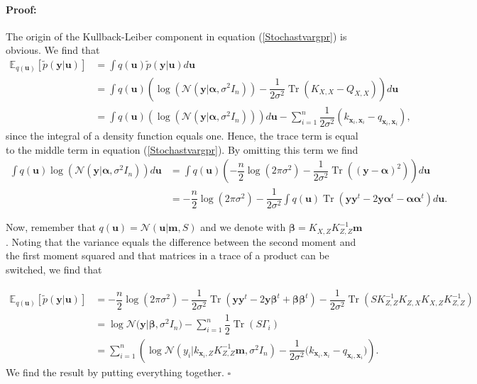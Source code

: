 \documentclass[12pt,a4paper,oneside]{book}
\newenvironment{proof}{\paragraph{Proof:}}{\hfill$\square$}
\DeclareMathOperator{\Tr}{Tr}
\begin{document}
\begin{proof}
The origin of the Kullback-Leiber component in equation (\ref{Stochastvargpr}) is obvious. We find that
\begin{align}
\mathbb{E}_{q(\bm{u})}[\tilde{p}(\bm{y}|\bm{u})]
&= \int q(\bm{u}) \tilde{p}(\bm{y}|\bm{u}) d\bm{u} \nonumber \\
&= \int q(\bm{u}) \left( \log \left( \mathcal{N}(\bm{y}|\bm{\alpha},\sigma^2 I_n) \right) - \dfrac{1}{2 \sigma^2} \Tr (K_{X,X} - Q_{X,X}) \right) d\bm{u} \nonumber \\
&= \int q(\bm{u}) \left( \log \left( \mathcal{N}(\bm{y}|\bm{\alpha},\sigma^2 I_n) \right) \right) d\bm{u} - \sum\limits_{i=1}^{n} \dfrac{1}{2 \sigma^2} (k_{\bm{x}_i,\bm{x}_i} - q_{\bm{x}_i,\bm{x}_i}),
\end{align} 
since the integral of a density function equals one. Hence, the trace term is equal to the middle term in equation (\ref{Stochastvargpr}). By omitting this term we find
\begin{align}
\int q(\bm{u}) \log \left( \mathcal{N}(\bm{y}|\bm{\alpha},\sigma^2 I_n) \right) d\bm{u}
&= \int q(\bm{u}) \left( -\dfrac{n}{2} \log(2 \pi \sigma^2) - \dfrac{1}{2 \sigma^2} \Tr \left( ( \bm{y} - \bm{\alpha})^2  \right) \right) d\bm{u} \nonumber \\
&=  - \dfrac{n}{2} \log (2 \pi \sigma^2) - \dfrac{1}{2 \sigma^2} \int q(\bm{u}) \Tr \left( \bm{y} \bm{y}^t - 2 \bm{y}\bm{\alpha}^t - \bm{\alpha}\bm{\alpha}^t   \right) d\bm{u}.
\end{align}

Now, remember that $q(\bm{u}) = \mathcal{N}(\bm{u}|\bm{m},S)$ and  we denote with $\bm{\beta} = K_{X,Z} K_{Z,Z}^{-1} \bm{m}$. Noting that the variance equals the difference between the second moment and the first moment squared and that matrices in a trace of a product can be switched, we find that 

\begin{align}
\mathbb{E}_{q(\bm{u})}[\tilde{p}(\bm{y}|\bm{u})] &=  - \dfrac{n}{2} \log (2 \pi \sigma^2) - \dfrac{1}{2 \sigma^2} \Tr \left( \bm{y} \bm{y}^t - 2 \bm{y}\bm{\beta}^t + \bm{\beta}\bm{\beta}^t \right)  - \dfrac{1}{2 \sigma^2}\Tr \left( S K_{Z,Z}^{-1} K_{Z,X} K_{X,Z} K_{Z,Z}^{-1} \right) \nonumber \\ &= \log{ \mathcal{N}(\bm{y} | \bm{\beta}, \sigma^2 I_n} ) - \sum_{i=1}^{n} \dfrac{1}{2} \Tr (S\Gamma_i) \nonumber \\
&= \sum\limits_{i=1}^{n}  \left( \log{\mathcal{N}(y_i|k_{\bm{x}_i,Z} K_{Z,Z}^{-1} \bm{m}, \sigma^2 I_n) - \dfrac{1}{2 \sigma^2} (k_{\bm{x}_i,\bm{x}_i} - q_{\bm{x}_i,\bm{x}_i}} ) \right).
\end{align}
We find the result by putting everything together. 
\end{proof}
\end{document}
